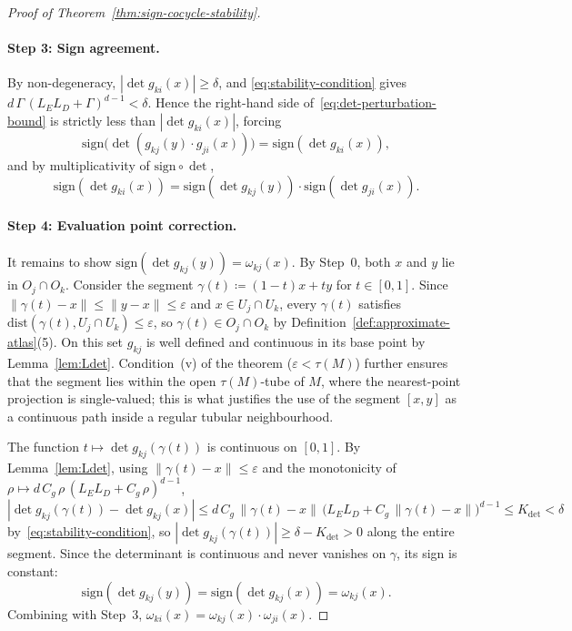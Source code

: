\documentclass[11pt]{article}
\newcommand{\sign}{\mathrm{sign}}
\theoremstyle{plain}
\theoremstyle{definition}
\theoremstyle{remark}
\begin{document}
\begin{appendices}
\begin{proof}[Proof of Theorem~\ref{thm:sign-cocycle-stability}]
\paragraph{Step 3: Sign agreement.}
By non-degeneracy, $|\det g_{ki}(x)| \geq \delta$, and \eqref{eq:stability-condition} gives $d\,\Gamma\,(L_E L_D + \Gamma)^{d-1} < \delta$. Hence the right-hand side of~\eqref{eq:det-perturbation-bound} is strictly less than $|\det g_{ki}(x)|$, forcing
\[
\sign\bigl(\det(g_{kj}(y) \cdot g_{ji}(x))\bigr) = \sign(\det g_{ki}(x)),
\]
and by multiplicativity of $\sign \circ \det$,
\[
\sign(\det g_{ki}(x)) = \sign(\det g_{kj}(y)) \cdot \sign(\det g_{ji}(x)).
\]

\paragraph{Step 4: Evaluation point correction.}
It remains to show $\sign(\det g_{kj}(y)) = \omega_{kj}(x)$. By Step~0, both $x$ and $y$ lie in $O_j \cap O_k$. Consider the segment $\gamma(t) \coloneqq (1-t)x + ty$ for $t \in [0, 1]$. Since $\|\gamma(t) - x\| \leq \|y - x\| \leq \varepsilon$ and $x \in U_j \cap U_k$, every $\gamma(t)$ satisfies $\mathrm{dist}(\gamma(t), U_j \cap U_k) \leq \varepsilon$, so $\gamma(t) \in O_j \cap O_k$ by Definition~\ref{def:approximate-atlas}(5). On this set $g_{kj}$ is well defined and continuous in its base point by Lemma~\ref{lem:Ldet}. Condition~(v) of the theorem ($\varepsilon < \tau(M)$) further ensures that the segment lies within the open $\tau(M)$-tube of $M$, where the nearest-point projection is single-valued; this is what justifies the use of the segment $[x, y]$ as a continuous path inside a regular tubular neighbourhood.

The function $t \mapsto \det g_{kj}(\gamma(t))$ is continuous on $[0,1]$. By Lemma~\ref{lem:Ldet}, using $\|\gamma(t) - x\| \leq \varepsilon$ and the monotonicity of $\rho \mapsto d\,C_g\,\rho\,(L_E L_D + C_g\,\rho)^{d-1}$,
\[
|\det g_{kj}(\gamma(t)) - \det g_{kj}(x)|
\leq d\,C_g\,\|\gamma(t) - x\|\,\bigl(L_E L_D + C_g\,\|\gamma(t) - x\|\bigr)^{d-1}
\leq K_{\det} < \delta
\]
by~\eqref{eq:stability-condition}, so $|\det g_{kj}(\gamma(t))| \geq \delta - K_{\det} > 0$ along the entire segment. Since the determinant is continuous and never vanishes on $\gamma$, its sign is constant:
\[
\sign(\det g_{kj}(y)) = \sign(\det g_{kj}(x)) = \omega_{kj}(x).
\]
Combining with Step~3, $\omega_{ki}(x) = \omega_{kj}(x) \cdot \omega_{ji}(x)$.
\end{proof}


\end{appendices}
\end{document}
